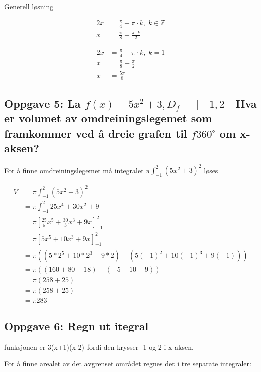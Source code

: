\documentclass{article}
\begin{document}
Generell løsning

\begin{align*}
    2x &= \frac{\pi}{4} + \pi \cdot k, \; k \in \mathbb{Z} \\
    x &= \frac{\pi}{8} + \frac{\pi \cdot k}{2}
\end{align*}

\begin{align*}
    2x &= \frac{\pi}{4} + \pi \cdot k, \; k = 1 \\
    x &= \frac{\pi}{8} + \frac{\pi}{2} \\
    x &= \frac{5\pi}{8}
\end{align*}



\subsection{Oppgave 5: La $f(x)=5x^2+3, D_f=[-1, 2]$ Hva er volumet av omdreiningslegemet som framkommer ved å dreie grafen til $f 360^\circ$ om x-aksen?}

For å finne omdreiningslegemet må integralet $\pi \int_{-1}^{2} (5x^2+3)^2$ løses

\begin{align*}
    V &= \pi \int_{-1}^{2} (5x^2+3)^2 \\
    &= \pi \int_{-1}^{2} 25x^4 + 30x^2 + 9 \\
    &= \pi [\frac{25}{5} x^5 + \frac{30}{3} x^3 + 9x]^2_{-1} \\
    &= \pi [5x^5 + 10 x^3 + 9x]^2_{-1} \\
    &= \pi ((5 * 2^5 + 10*2^3 + 9*2) - (5(-1)^2 + 10(-1)^3 + 9(-1))) \\
    &= \pi ((160 + 80 + 18) - (-5-10-9)) \\
    &= \pi (258 + 25) \\ 
    &= \pi (258 + 25) \\
    &= \pi 283
\end{align*}

\subsection{Oppgave 6: Regn ut itegral}

funksjonen er 3(x+1)(x-2) fordi den krysser -1 og 2 i x aksen.

For å finne arealet av det avgrenset området regnes det i tre separate integraler:
\end{document}
